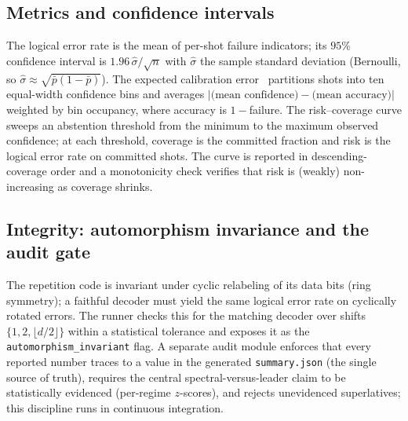 \documentclass[reprint,aps,prxquantum,amsmath,amssymb,floatfix,nofootinbib,longbibliography]{revtex4-2}
\theoremstyle{definition}
\theoremstyle{remark}
\theoremstyle{plain}
\newcommand{\abs}[1]{\left\lvert #1 \right\rvert}
\begin{document}
\subsection{Metrics and confidence intervals}
\label{sec:methods_metrics}
The logical error rate is the mean of per-shot failure indicators; its $95\%$ confidence interval is $1.96\,\hat\sigma/\sqrt n$ with $\hat\sigma$ the sample standard deviation (Bernoulli, so $\hat\sigma\approx\sqrt{\bar p(1-\bar p)}$). The expected calibration error~\cite{guo2017calibration,naeini2015obtaining} partitions shots into ten equal-width confidence bins and averages $\abs{\text{(mean confidence)}-\text{(mean accuracy)}}$ weighted by bin occupancy, where accuracy is $1-$failure. The risk--coverage curve sweeps an abstention threshold from the minimum to the maximum observed confidence; at each threshold, coverage is the committed fraction and risk is the logical error rate on committed shots. The curve is reported in descending-coverage order and a monotonicity check verifies that risk is (weakly) non-increasing as coverage shrinks.

\subsection{Integrity: automorphism invariance and the audit gate}
\label{sec:methods_audit}
The repetition code is invariant under cyclic relabeling of its data bits (ring symmetry); a faithful decoder must yield the same logical error rate on cyclically rotated errors. The runner checks this for the matching decoder over shifts $\{1,2,\lfloor d/2\rfloor\}$ within a statistical tolerance and exposes it as the \texttt{automorphism\_invariant} flag. A separate audit module enforces that every reported number traces to a value in the generated \texttt{summary.json} (the single source of truth), requires the central spectral-versus-leader claim to be statistically evidenced (per-regime $z$-scores), and rejects unevidenced superlatives; this discipline runs in continuous integration.
\end{document}
